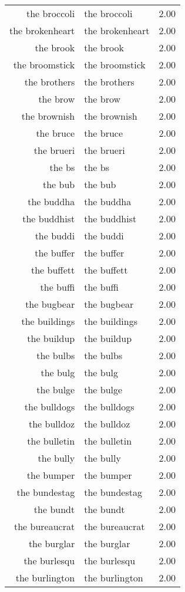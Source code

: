 \begin{table}[ht]
\begin{tabular}{rlr}
  the broccoli & the broccoli & 2.00 \\ 
  the brokenheart & the brokenheart & 2.00 \\ 
  the brook & the brook & 2.00 \\ 
  the broomstick & the broomstick & 2.00 \\ 
  the brothers & the brothers & 2.00 \\ 
  the brow & the brow & 2.00 \\ 
  the brownish & the brownish & 2.00 \\ 
  the bruce & the bruce & 2.00 \\ 
  the brueri & the brueri & 2.00 \\ 
  the bs & the bs & 2.00 \\ 
  the bub & the bub & 2.00 \\ 
  the buddha & the buddha & 2.00 \\ 
  the buddhist & the buddhist & 2.00 \\ 
  the buddi & the buddi & 2.00 \\ 
  the buffer & the buffer & 2.00 \\ 
  the buffett & the buffett & 2.00 \\ 
  the buffi & the buffi & 2.00 \\ 
  the bugbear & the bugbear & 2.00 \\ 
  the buildings & the buildings & 2.00 \\ 
  the buildup & the buildup & 2.00 \\ 
  the bulbs & the bulbs & 2.00 \\ 
  the bulg & the bulg & 2.00 \\ 
  the bulge & the bulge & 2.00 \\ 
  the bulldogs & the bulldogs & 2.00 \\ 
  the bulldoz & the bulldoz & 2.00 \\ 
  the bulletin & the bulletin & 2.00 \\ 
  the bully & the bully & 2.00 \\ 
  the bumper & the bumper & 2.00 \\ 
  the bundestag & the bundestag & 2.00 \\ 
  the bundt & the bundt & 2.00 \\ 
  the bureaucrat & the bureaucrat & 2.00 \\ 
  the burglar & the burglar & 2.00 \\ 
  the burlesqu & the burlesqu & 2.00 \\ 
  the burlington & the burlington & 2.00 \\ 

\end{tabular}
\end{table}
